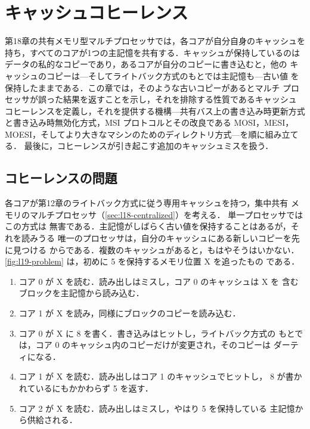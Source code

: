 \documentclass[../main.tex]{subfiles}
\begin{document}
\chapter{キャッシュコヒーレンス}

第18章の共有メモリ型マルチプロセッサでは，各コアが自分自身のキャッシュを
持ち，すべてのコアが1つの主記憶を共有する．キャッシュが保持しているのは
データの私的なコピーであり，あるコアが自分のコピーに書き込むと，他の
キャッシュのコピーは---そしてライトバック方式のもとでは主記憶も---古い値
を保持したままである．この章では，そのような古いコピーがあるとマルチ
プロセッサが誤った結果を返すことを示し，それを排除する性質であるキャッシュ
コヒーレンスを定義し，それを提供する機構---共有バス上の書き込み時更新方式
と書き込み時無効化方式，MSI プロトコルとその改良である MOSI，MESI，
MOESI，そしてより大きなマシンのためのディレクトリ方式---を順に組み立てる．
最後に，コヒーレンスが引き起こす追加のキャッシュミスを扱う．

\section{コヒーレンスの問題}
\label{sec:l19-problem}

各コアが第12章のライトバック方式に従う専用キャッシュを持つ，集中共有
メモリのマルチプロセッサ（\cref{sec:l18-centralized}）を考える．
単一プロセッサではこの方式は
無害である．主記憶がしばらく古い値を保持することはあるが，それを読みうる
唯一のプロセッサは，自分のキャッシュにある新しいコピーを先に見つける
からである．複数のキャッシュがあると，もはやそうはいかない．
\cref{fig:l19-problem} は，初めに 5 を保持するメモリ位置 X を追ったもの
である．
\begin{enumerate}
  \item コア 0 が X を読む．読み出しはミスし，コア 0 のキャッシュは X を
    含むブロックを主記憶から読み込む．
  \item コア 1 が X を読み，同様にブロックのコピーを読み込む．
  \item コア 0 が X に 8 を書く．書き込みはヒットし，ライトバック方式の
    もとでは，コア 0 のキャッシュ内のコピーだけが変更され，そのコピーは
    ダーティになる．
  \item コア 1 が X を読む．読み出しはコア 1 のキャッシュでヒットし，
    8 が書かれているにもかかわらず 5 を返す．
  \item コア 2 が X を読む．読み出しはミスし，やはり 5 を保持している
    主記憶から供給される．
\end{enumerate}
\end{document}
